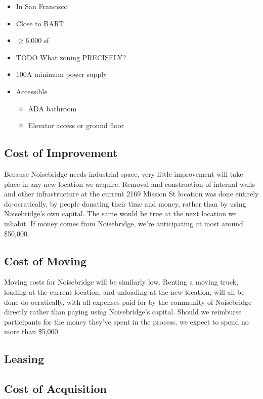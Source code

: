 \documentclass[12pt]{article}
\begin{document}
\begin{itemize}
    \item In San Francisco
    \item Close to BART
    \item $\geq$6,000 sf
    \item TODO What zoning PRECISELY?
    \item 100A minimum power supply
    \item Accessible
        \begin{itemize}
            \item ADA bathroom
            \item Elevator access or ground floor
        \end{itemize}
\end{itemize}

\subsection{Cost of Improvement}

Because Noisebridge needs industrial space, very little improvement will take place in any new location we acquire. Removal and construction of internal walls and other infrastructure at the current 2169 Mission St location was done entirely do-ocratically, by people donating their time and money, rather than by using Noisebridge's own capital. The same would be true at the next location we inhabit. If money comes from Noisebridge, we're anticipating at most around \$50,000.

\subsection{Cost of Moving}

Moving costs for Noisebridge will be similarly low. Renting a moving truck, loading at the current location, and unloading at the new location, will all be done do-ocratically, with all expenses paid for by the community of Noisebridge directly rather than paying using Noisebridge's capital. Should we reimburse participants for the money they've spent in the process, we expect to spend no more than \$5,000.

\subsection{Leasing}

\subsection{Cost of Acquisition}
\end{document}
